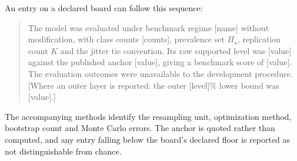 \documentclass[11pt]{article}
\newcommand{\PSet}{\Pi_\star}
\theoremstyle{remark}
\begin{document}
An entry on a declared board can follow this sequence:
\begin{quote}
The model was evaluated under benchmark regime [name] without modification, with class counts [counts], prevalence set $\PSet$, replication count $K$ and the jitter tie convention. Its raw supported level was [value] against the published anchor [value], giving a benchmark score of [value]. The evaluation outcomes were unavailable to the development procedure. [Where an outer layer is reported: the outer [level]\% lower bound was [value].]
\end{quote}
The accompanying methods identify the resampling unit, optimization method, bootstrap count and Monte Carlo errors. The anchor is quoted rather than computed, and any entry falling below the board's declared floor is reported as not distinguishable from chance.
\end{document}
